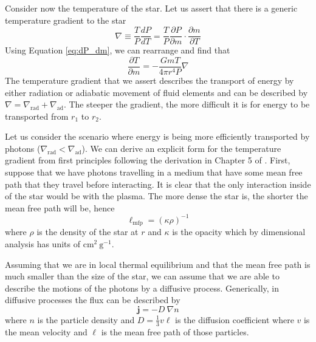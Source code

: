Consider now the temperature of the star.
Let us assert that there is a generic temperature gradient to the star
\[
    \nabla \equiv \frac{T}{P}\frac{dP}{dT} = \frac{T}{P}\frac{\partial P}{\partial m} \cdot \frac{\partial m}{\partial T}
\]
Using Equation \ref{eq:dP_dm}, we can rearrange and find that
\begin{equation}\label{eq:dT_dm}
    \frac{\partial T}{\partial m} = - \frac{G m T}{4 \pi r^4 P} \nabla
\end{equation}
The temperature gradient that we assert describes the transport of energy by either radiation or adiabatic movement of fluid elements and can be described by $\nabla = \nabla_{\mathrm{rad}} + \nabla_{\mathrm{ad}}$.
The steeper the gradient, the more difficult it is for energy to be transported from $r_1$ to $r_2$.

Let us consider the scenario where energy is being more efficiently transported by photons ($\nabla_{\mathrm{rad}} < \nabla_{\mathrm{ad}}$).
We can derive an explicit form for the temperature gradient from first principles following the derivation in Chapter 5 of \cite{kippenhahnStellarStructureEvolution2013}.
First, suppose that we have photons travelling in a medium that have some mean free path that they travel before interacting.
It is clear that the only interaction inside of the star would be with the plasma.
The more dense the star is, the shorter the mean free path will be, hence 
\[
    \ell_{\mathrm{mfp}} = (\kappa\rho)^{-1}
\]
where $\rho$ is the density of the star at $r$ and $\kappa$ is the opacity which by dimensional analysis has units of $\mathrm{cm^2~g^{-1}}$.

Assuming that we are in local thermal equilibrium and that the mean free path is much smaller than the size of the star, we can assume that we are able to describe the motions of the photons by a diffusive process.
Generically, in diffusive processes the flux can be described by
\[
    \mathbf{j} = -D~\nabla n
\]
where $n$ is the particle density and $D=\frac{1}{3}v\ell$ is the diffusion coefficient where $v$ is the mean velocity and $\ell$ is the mean free path of those particles.

